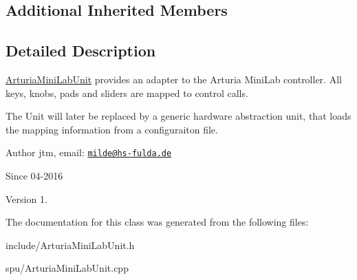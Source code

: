 \subsection*{Additional Inherited Members}


\subsection{Detailed Description}
\hyperlink{classArturiaMiniLabUnit}{Arturia\-Mini\-Lab\-Unit} provides an adapter to the Arturia Mini\-Lab controller. All keys, knobs, pads and sliders are mapped to control calls.

The Unit will later be replaced by a generic hardware abstraction unit, that loads the mapping information from a configuraiton file.

\begin{DoxyAuthor}{Author}
jtm, email\-:  \href{mailto:milde@hs-fulda.de}{\tt milde@hs-\/fulda.\-de} 
\end{DoxyAuthor}
\begin{DoxySince}{Since}
04-\/2016 
\end{DoxySince}
\begin{DoxyVersion}{Version}
1. 
\end{DoxyVersion}


The documentation for this class was generated from the following files\-:\begin{DoxyCompactItemize}
\item 
include/Arturia\-Mini\-Lab\-Unit.\-h\item 
spu/Arturia\-Mini\-Lab\-Unit.\-cpp\end{DoxyCompactItemize}
